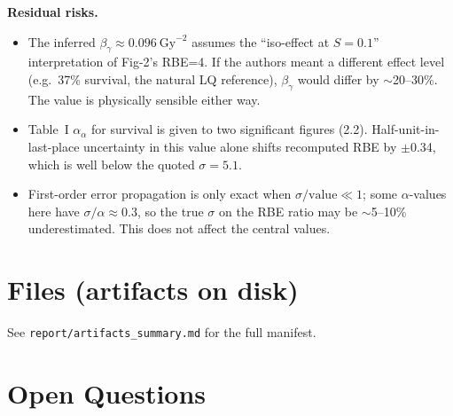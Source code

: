 \documentclass[11pt]{article}
\begin{document}
\textbf{Residual risks.}
\begin{itemize}
\item The inferred $\beta_\gamma \approx 0.096~\text{Gy}^{-2}$ assumes
      the ``iso-effect at $S=0.1$'' interpretation of Fig-2's RBE=4.
      If the authors meant a different effect level (e.g.\ 37\% survival,
      the natural LQ reference), $\beta_\gamma$ would differ by
      $\sim$20--30\%. The value is physically sensible either way.
\item Table~I $\alpha_\alpha$ for survival is given to two significant
      figures (2.2). Half-unit-in-last-place uncertainty in this value
      alone shifts recomputed RBE by $\pm$0.34, which is well below the
      quoted $\sigma=5.1$.
\item First-order error propagation is only exact when $\sigma/\text{value}
      \ll 1$; some $\alpha$-values here have $\sigma/\alpha \approx 0.3$,
      so the true $\sigma$ on the RBE ratio may be $\sim$5--10\%
      underestimated. This does not affect the central values.
\end{itemize}

\section{Files (artifacts on disk)}
See \texttt{report/artifacts\_summary.md} for the full manifest.

\section{Open Questions}

\end{document}

